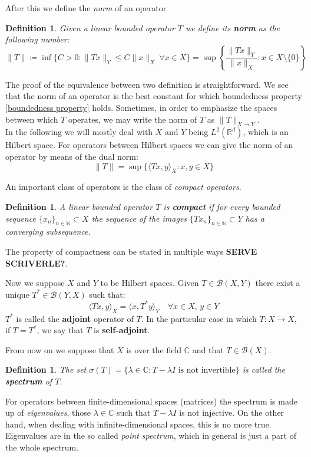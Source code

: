 \documentclass[corpo=11pt, stile=classica, tipotesi=custom,
greek, evenboxes, english]{toptesi}
\numberwithin{equation}{chapter}
\newtheorem{defi}[teo]{Definition}
\newcommand{\R}{\mathbb{R}} %
\newcommand{\N}{\mathbb{N}} %
\newcommand{\C}{\mathbb{C}} %
\newcommand{\B}{\mathcal{B}} %
\begin{document}
After this we define the \emph{norm} of an operator
\begin{defi}\label{norm operator}
	Given a linear bounded operator $T$ we define its \textbf{norm} as the following number:
	\begin{equation*}
		\|T\| \coloneqq \inf\{C>0 : \| Tx \|_Y \leq C \| x \|_X \  \forall x \in X\} = \sup \left\{ \dfrac{\| Tx \|_Y}{\| x \|_X} : x \in X \setminus \{0\}\right\}
	\end{equation*}
\end{defi}
The proof of the equivalence between two definition is straightforward. We see that the norm of an operator is the best constant for which boundedness property \eqref{boundedness property} holds. {\color{blue} Sometimes, in order to emphasize the spaces between which $T$ operates, we may write the norm of $T$ as $\| T \|_{X \rightarrow Y}$.}\\
In the following we will mostly deal with $X$ and $Y$ being $L^2(\R^d)$, which is an Hilbert space. {\color{red} For operators between Hilbert spaces we can give the norm of an operator by means of the dual norm}:
\begin{equation*}
	\| T \| = \sup\{\langle Tx, y \rangle_X : x,y \in X\}
\end{equation*}

An important class of operators is the class of \emph{compact operators}.
\begin{defi}\label{compact operator}
	A linear bounded operator $T$ is \textbf{compact} if for every bounded sequence $\{x_n\}_{n \in \N} \subset X$ the sequence of the images $\{Tx_n\}_{n \in \N} \subset Y$ has a converging subsequence.
\end{defi}
The property of compactness can be stated in multiple ways \textbf{SERVE SCRIVERLE?}.

Now we suppose $X$ and $Y$ to be Hilbert spaces. Given $T \in \B(X,Y)$ there exist a unique $T^* \in \B(Y,X)$ such that:
\begin{equation*}
	\langle Tx, y \rangle_X = \langle x, T^* y \rangle_Y \quad \forall x \in X,\,y \in Y
\end{equation*}
$T^*$ is called the \textbf{adjoint} operator of $T$. In the particular case in which $T : X \rightarrow X$, if $T=T^*$, we say that $T$ is \textbf{self-adjoint}.

From now on we suppose that $X$ is over the field $\C$ and that $T \in \B(X)$.
\begin{defi}\label{spectrum def}
	The set $\sigma(T) = \{\lambda \in \C : T - \lambda I \text{ is not invertible}\}$ is called  the \textbf{spectrum} of $T$.
\end{defi}
For operators between finite-dimensional spaces (matrices) the spectrum is made up of \emph{eigenvalues}, those $\lambda \in \C$ such that $T-\lambda I$ is not injective. On the other hand, when dealing with infinite-dimensional spaces, this is no more true. Eigenvalues are in the so called \emph{point spectrum}, which in general is just a part of the whole spectrum.
\end{document}
